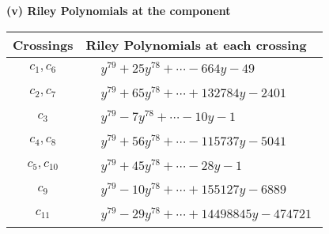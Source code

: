 \documentclass[1p]{elsarticle_modified}
\theoremstyle{definition}
\begin{document}
\flushleft \textbf{(v) Riley Polynomials at the component}\newline \\
\begin{tabular}{m{50pt}|m{274pt}}
Crossings & \hspace{64pt}Riley Polynomials at each crossing \\
\hline $$\begin{aligned}c_{1},c_{6}\end{aligned}$$&$\begin{aligned}
&y^{79}+25 y^{78}+\cdots-664 y-49
\end{aligned}$\\
\hline $$\begin{aligned}c_{2},c_{7}\end{aligned}$$&$\begin{aligned}
&y^{79}+65 y^{78}+\cdots+132784 y-2401
\end{aligned}$\\
\hline $$\begin{aligned}c_{3}\end{aligned}$$&$\begin{aligned}
&y^{79}-7 y^{78}+\cdots-10 y-1
\end{aligned}$\\
\hline $$\begin{aligned}c_{4},c_{8}\end{aligned}$$&$\begin{aligned}
&y^{79}+56 y^{78}+\cdots-115737 y-5041
\end{aligned}$\\
\hline $$\begin{aligned}c_{5},c_{10}\end{aligned}$$&$\begin{aligned}
&y^{79}+45 y^{78}+\cdots-28 y-1
\end{aligned}$\\
\hline $$\begin{aligned}c_{9}\end{aligned}$$&$\begin{aligned}
&y^{79}-10 y^{78}+\cdots+155127 y-6889
\end{aligned}$\\
\hline $$\begin{aligned}c_{11}\end{aligned}$$&$\begin{aligned}
&y^{79}-29 y^{78}+\cdots+14498845 y-474721
\end{aligned}$\\
\hline
\end{tabular}\\~\\
\end{document}
